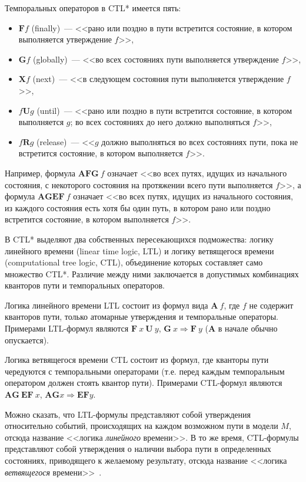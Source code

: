 \documentclass[a4paper,notitlepage,14pt]{article}
\begin{document}
Темпоральных операторов в CTL* имеется пять:

\begin{itemize}
\item $\mathbf{F} f$ (finally)~--- <<рано или поздно в пути встретится состояние, в котором
  выполняется утверждение $f$>>,
\item $\mathbf{G} f$ (globally)~--- <<во всех состояниях пути выполняется утверждение
  $f$>>,
\item $\mathbf{X} f$ (next)~--- <<в следующем состояния пути выполняется утверждение
  $f$>>,
\item $f \mathbf{U} g$ (until)~--- <<рано или поздно в пути встретится состояние, в
  котором выполняется $g$; во всех состояниях до него должно выполняться $f$>>,
\item $f \mathbf{R} g$ (release)~--- <<$g$ должно выполняться во всех состояниях пути,
  пока не встретится состояние, в котором выполняется $f$>>.
\end{itemize}

Например, формула $\mathbf{AFG}~ f$ означает <<во всех путях, идущих из начального
состояния, с некоторого состояния на протяжении всего пути выполняется $f$>>, а формула
$\mathbf{AGEF}~ f$ означает <<во всех путях, идущих из начального состояния, из каждого
состояния есть хотя бы один путь, в котором рано или поздно встретится состояние, в
котором выполняется $f$>>.

В CTL* выделяют два собственных пересекающихся подможества: логику линейного времени
(linear time logic, LTL) и логику ветвящегося времени (computational tree logic, CTL),
объединение которых составляет само множество CTL*. Различие между ними заключается в
допустимых комбинациях кванторов пути и темпоральных операторов.

Логика линейного времени LTL состоит из формул вида $\mathbf{A}~f$, где $f$ не содержит
кванторов пути, только атомарные утверждения и темпоральные операторы. Примерами
LTL-формул являются $\mathbf{F}~x~\mathbf{U}~y$, $\mathbf{G}~x \Rightarrow \mathbf{F}~y$
($\mathbf{A}$ в начале обычно опускается).

Логика ветвящегося времени CTL состоит из формул, где кванторы пути чередуются с
темпоральными операторами (т.е. перед каждым темпоральным оператором должен стоять квантор
пути). Примерами CTL-формул являются $\mathbf{AG}~\mathbf{EF}~x$, $\mathbf{AG} x
\Rightarrow \mathbf{EF} y$.

Можно сказать, что LTL-формулы представляют собой утверждения относительно событий,
происходящих на каждом возможном пути в модели $M$, отсюда название <<логика
\emph{линейного} времени>>. В то же время, CTL-формулы представляют собой утверждения о
наличии выбора пути в определенных состояниях, приводящего к желаемому результату, отсюда
название <<логика \emph{ветвящегося} времени>>~\cite{Clarke}.
\end{document}
